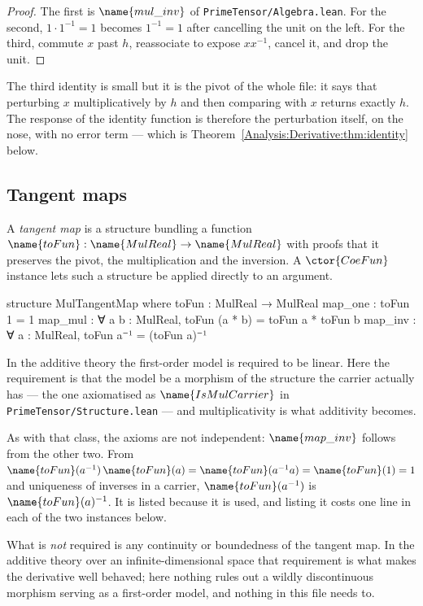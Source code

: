 \begin{proof}
The first is $\name{mul\_inv}$ of \texttt{PrimeTensor/Algebra.lean}.  For the
second, $1 \cdot 1^{-1} = 1$ becomes $1^{-1} = 1$ after cancelling the unit on
the left.  For the third, commute $x$ past $h$, reassociate to expose
$x x^{-1}$, cancel it, and drop the unit.
\end{proof}

The third identity is small but it is the pivot of the whole file: it says that
perturbing $x$ multiplicatively by $h$ and then comparing with $x$ returns
exactly $h$.  The response of the identity function is therefore the
perturbation itself, on the nose, with no error term --- which is
Theorem~\ref{Analysis:Derivative:thm:identity} below.

\subsection{Tangent maps}

\begin{definition}\label{Analysis:Derivative:def:tangent}
A \emph{tangent map} is a structure bundling a function
$\name{toFun} : \name{MulReal} \to \name{MulReal}$ with proofs that it
preserves the pivot, the multiplication and the inversion.  A $\ctor{CoeFun}$
instance lets such a structure be applied directly to an argument.
\end{definition}

\begin{leancode}
structure MulTangentMap where
  toFun : MulReal → MulReal
  map_one : toFun 1 = 1
  map_mul : ∀ a b : MulReal, toFun (a * b) = toFun a * toFun b
  map_inv : ∀ a : MulReal, toFun a⁻¹ = (toFun a)⁻¹
\end{leancode}

\begin{remark}
\label{Analysis:Derivative:rem:tangent}
In the additive theory the first-order model is required to be linear.  Here
the requirement is that the model be a morphism of the structure the carrier
actually has --- the one axiomatised as $\name{IsMulCarrier}$ in
\texttt{PrimeTensor/Structure.lean} --- and multiplicativity is what
additivity becomes.

As with that class, the axioms are not independent: $\name{map\_inv}$ follows
from the other two.  From $\name{toFun}(a^{-1})\,\name{toFun}(a) =
\name{toFun}(a^{-1}a) = \name{toFun}(1) = 1$ and uniqueness of inverses in a
carrier, $\name{toFun}(a^{-1})$ is $\name{toFun}(a)^{-1}$.  It is listed
because it is used, and listing it costs one line in each of the two instances
below.

What is \emph{not} required is any continuity or boundedness of the tangent
map.  In the additive theory over an infinite-dimensional space that
requirement is what makes the derivative well behaved; here nothing rules out a
wildly discontinuous morphism serving as a first-order model, and nothing in
this file needs to.
\end{remark}

